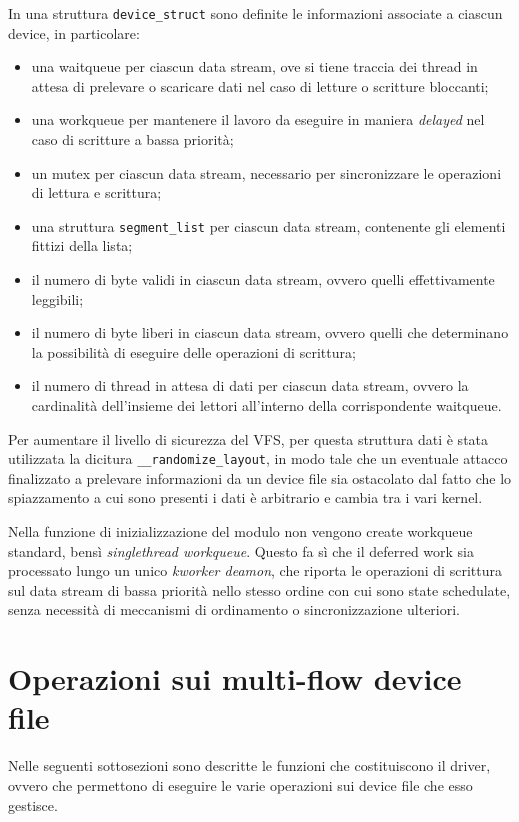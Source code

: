 \documentclass{article}
\begin{document}
In una struttura \texttt{device\_struct} sono definite le informazioni associate a ciascun device, in particolare:
\begin{itemize}
\item una waitqueue per ciascun data stream, ove si tiene traccia dei thread in attesa di prelevare o scaricare dati nel caso di letture o scritture bloccanti;
\item una workqueue per mantenere il lavoro da eseguire in maniera \textsl{delayed} nel caso di scritture a bassa priorità;
\item un mutex per ciascun data stream, necessario per sincronizzare le operazioni di lettura e scrittura;
\item una struttura \texttt{segment\_list} per ciascun data stream, contenente gli elementi fittizi della lista;
\item il numero di byte validi in ciascun data stream, ovvero quelli effettivamente leggibili;
\item il numero di byte liberi in ciascun data stream, ovvero quelli che determinano la possibilità di eseguire delle operazioni di scrittura;
\item il numero di thread in attesa di dati per ciascun data stream, ovvero la cardinalità dell'insieme dei lettori all'interno della corrispondente waitqueue.
\end{itemize}
Per aumentare il livello di sicurezza del VFS, per questa struttura dati è stata utilizzata la dicitura \texttt{\_\_randomize\_layout}, in modo tale che un eventuale attacco finalizzato a prelevare informazioni da un device file sia ostacolato dal fatto che lo spiazzamento a cui sono presenti i dati è arbitrario e cambia tra i vari kernel.

Nella funzione di inizializzazione del modulo non vengono create workqueue standard, bensì \textsl{singlethread workqueue}. Questo fa sì che il deferred work sia processato lungo un unico \textsl{kworker deamon}, che riporta le operazioni di scrittura sul data stream di bassa priorità nello stesso ordine con cui sono state schedulate, senza necessità di meccanismi di ordinamento o sincronizzazione ulteriori.

\section{Operazioni sui multi-flow device file}
Nelle seguenti sottosezioni sono descritte le funzioni che costituiscono il driver, ovvero che permettono di eseguire le varie operazioni sui device file che esso gestisce.
\end{document}
